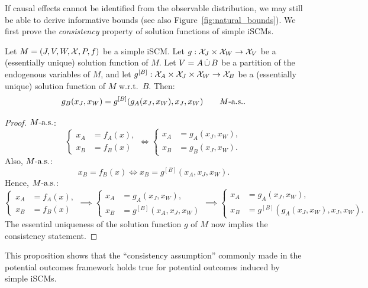 If causal effects cannot be identified from the observable distribution, we may still be able to derive informative bounds (see also Figure~\ref{fig:natural_bounds}).
We first prove the \emph{consistency} property of solution functions of simple iSCMs.
\begin{Prp}\label{prp:simple_scm_consistency}
  Let $M = \left ( J, V, W, \mathcal{X}, P, f \right )$ be a simple iSCM.
  Let $g : \mathcal{X}_{J} \times \mathcal{X}_{W} \to \mathcal{X}_{V}$ be a (essentially unique) solution function of $M$.
  Let $V = A \,\dot{\cup}\, B$ be a partition of the endogenous variables of $M$,
  and let $g^{[B]} : \mathcal{X}_A \times \mathcal{X}_{J} \times \mathcal{X}_{W} \to \mathcal{X}_B$ be a (essentially unique) solution function of $M$ w.r.t.\ $B$. 
  Then:
  $$g_B(x_J,x_W) = g^{[B]}(g_A(x_J,x_W),x_J,x_W)\qquad M\text{-a.s.}.$$
\end{Prp}
\begin{proof}
  $M\text{-a.s.}$:
  $$\begin{cases}
    x_A & = f_A(x), \\
    x_B & = f_B(x)
  \end{cases} \iff
  \begin{cases}
    x_A & = g_A(x_J,x_W), \\
    x_B & = g_B(x_J,x_W).
  \end{cases}$$
  Also, $M\text{-a.s.}$:
  $$x_B = f_B(x)
   \iff x_B = g^{[B]}(x_A,x_J,x_W).$$
  Hence, $M\text{-a.s.}$:
  $$\begin{cases}
    x_A & = f_A(x), \\
    x_B & = f_B(x)
  \end{cases} \implies
  \begin{cases}
    x_A & = g_A(x_J,x_W), \\
    x_B & = g^{[B]}(x_A,x_J,x_W)
  \end{cases}\implies
  \begin{cases}
    x_A & = g_A(x_J,x_W), \\
    x_B & = g^{[B]}(g_A(x_J,x_W),x_J,x_W).
  \end{cases}$$
  The essential uniqueness of the solution function $g$ of $M$ now implies the consistency statement.
\end{proof}
This proposition shows that the ``consistency assumption'' commonly made in the potential outcomes framework holds true for potential outcomes induced by simple iSCMs.

